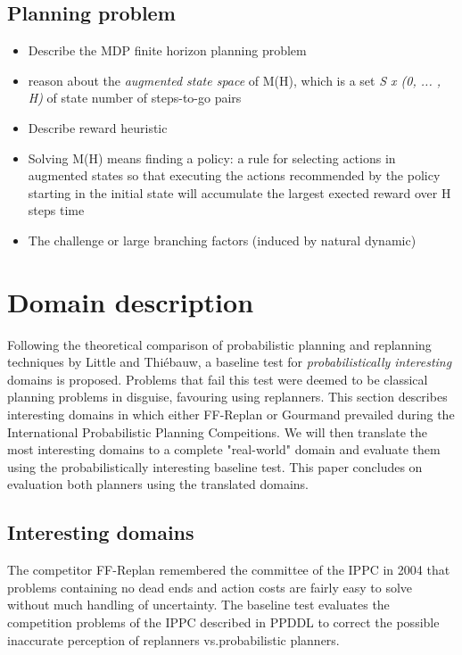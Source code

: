 \documentclass[runningheads,a4paper]{llncs}
\begin{document}
\subsection{Planning problem}
\begin{itemize}
	\item Describe the MDP finite horizon planning problem
	\item reason about the \emph{augmented state space} of M(H), which is a set \emph{S x (0, ... , H)} of state number of steps-to-go pairs
	\item Describe reward heuristic
	\item Solving M(H) means finding a policy: a rule for selecting actions in augmented states so that executing the actions recommended by the policy starting in the initial state will accumulate the largest exected reward over H steps time
	\item The challenge or large branching factors (induced by natural dynamic)
\end{itemize}



\section{Domain description}
Following the theoretical comparison of probabilistic planning and replanning techniques by Little and Thi\'ebauw, a baseline test for \emph{probabilistically interesting} domains is proposed. Problems that fail this test were deemed to be classical planning problems in disguise, favouring using replanners\cite{little2007probvsreplan}. This section describes interesting domains in which either FF-Replan or Gourmand prevailed during the International Probabilistic Planning Compeitions. We will then translate the most interesting domains to a complete "real-world" domain and evaluate them using the probabilistically interesting baseline test. This paper concludes on evaluation both planners using the translated domains.

\subsection{Interesting domains}
The competitor FF-Replan\cite{FFReplan} remembered the committee of the IPPC in 2004 that problems containing no dead ends and action costs are fairly easy to solve without much handling of uncertainty. The baseline test evaluates the competition problems of the IPPC described in PPDDL to correct the possible inaccurate perception of replanners vs.\@ probabilistic planners.
\end{document}
